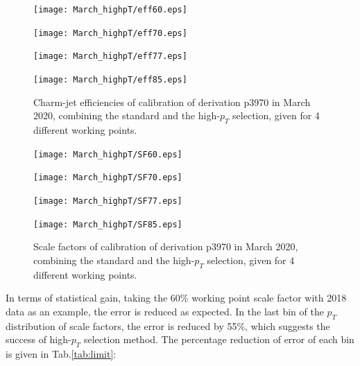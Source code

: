 \documentclass[letterpaper,12pt]{article}
\begin{document}
\begin{figure}[H]
\begin{minipage}[b]{.45\textwidth}
\centering
\texttt{[image: March\_highpT/eff60.eps]}
\end{minipage}\hfill
\begin{minipage}[b]{.45\textwidth}
\centering
\texttt{[image: March\_highpT/eff70.eps]}
\end{minipage}\hfill
\begin{minipage}[b]{.45\textwidth}
\centering
\texttt{[image: March\_highpT/eff77.eps]}
\end{minipage}\hfill
\begin{minipage}[b]{.45\textwidth}
\centering
\texttt{[image: March\_highpT/eff85.eps]}
\end{minipage}
\caption{Charm-jet efficiencies of calibration of derivation p3970 in March 2020, combining the standard 
and the high-$p_{T}$ selection, given for  4 different working points.} \label{fig:March_highpT_eff}
\end{figure}


\begin{figure}[H]
\begin{minipage}[b]{.45\textwidth}
\centering
\texttt{[image: March\_highpT/SF60.eps]}
\end{minipage}\hfill
\begin{minipage}[b]{.45\textwidth}
\centering
\texttt{[image: March\_highpT/SF70.eps]}
\end{minipage}\hfill
\begin{minipage}[b]{.45\textwidth}
\centering
\texttt{[image: March\_highpT/SF77.eps]}
\end{minipage}\hfill
\begin{minipage}[b]{.45\textwidth}
\centering
\texttt{[image: March\_highpT/SF85.eps]}
\end{minipage}
\caption{Scale factors of calibration of derivation p3970 in March 2020, combining the standard and the high-$p_{T}$ selection, given for  4 different working points.} \label{fig:March_highpT}
\end{figure}



In terms of statistical gain, taking the 60\% working point scale factor with 2018 data as an example, the error is reduced as expected. In the last bin of the $p_{T}$ distribution of scale factors, the error is reduced by 55\%, which suggests the success of high-$p_{T}$ selection method. The percentage reduction of error of each bin is given in Tab.\ref{tab:limit}:
\end{document}
